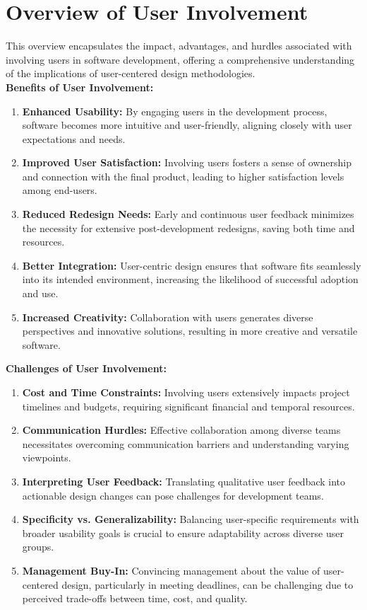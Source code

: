 \documentclass{article}
\begin{document}
\section{Overview of User Involvement}
This overview encapsulates the impact, advantages, and hurdles associated with involving users in software development, offering a comprehensive understanding of the implications of user-centered design methodologies.
\\
\textbf{Benefits of User Involvement:}
\begin{enumerate}
    \item \textbf{Enhanced Usability:} By engaging users in the development process, software becomes more intuitive and user-friendly, aligning closely with user expectations and needs.
    \item \textbf{Improved User Satisfaction:} Involving users fosters a sense of ownership and connection with the final product, leading to higher satisfaction levels among end-users.
    \item \textbf{Reduced Redesign Needs:} Early and continuous user feedback minimizes the necessity for extensive post-development redesigns, saving both time and resources.
    \item \textbf{Better Integration:} User-centric design ensures that software fits seamlessly into its intended environment, increasing the likelihood of successful adoption and use.
    \item \textbf{Increased Creativity:} Collaboration with users generates diverse perspectives and innovative solutions, resulting in more creative and versatile software.
\end{enumerate}

\textbf{Challenges of User Involvement:}
\begin{enumerate}
    \item \textbf{Cost and Time Constraints:} Involving users extensively impacts project timelines and budgets, requiring significant financial and temporal resources.
    \item \textbf{Communication Hurdles:} Effective collaboration among diverse teams necessitates overcoming communication barriers and understanding varying viewpoints.
    \item \textbf{Interpreting User Feedback:} Translating qualitative user feedback into actionable design changes can pose challenges for development teams.
    \item \textbf{Specificity vs. Generalizability:} Balancing user-specific requirements with broader usability goals is crucial to ensure adaptability across diverse user groups.
    \item \textbf{Management Buy-In:} Convincing management about the value of user-centered design, particularly in meeting deadlines, can be challenging due to perceived trade-offs between time, cost, and quality.
\end{enumerate}
\end{document}
